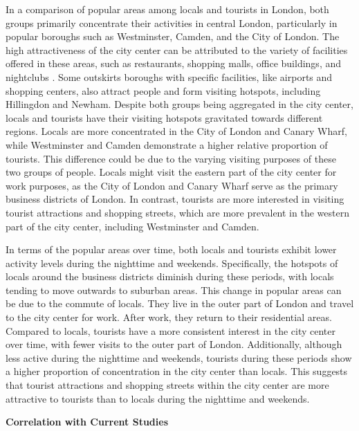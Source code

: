 \documentclass{article}
\theoremstyle{remark}
\begin{document}
In a comparison of popular areas among locals and tourists in London, both groups primarily concentrate their activities in central London, particularly in popular boroughs such as Westminster, Camden, and the City of London. The high attractiveness of the city center can be attributed to the variety of facilities offered in these areas, such as restaurants, shopping malls, office buildings, and nightclubs \citep{lau_understanding_2006}. Some outskirts boroughs with specific facilities, like airports and shopping centers, also attract people and form visiting hotspots, including Hillingdon and Newham. Despite both groups being aggregated in the city center, locals and tourists have their visiting hotspots gravitated towards different regions. Locals are more concentrated in the City of London and Canary Wharf, while Westminster and Camden demonstrate a higher relative proportion of tourists. This difference could be due to the varying visiting purposes of these two groups of people. Locals might visit the eastern part of the city center for work purposes, as the City of London and Canary Wharf serve as the primary business districts of London. In contrast, tourists are more interested in visiting tourist attractions and shopping streets, which are more prevalent in the western part of the city center, including Westminster and Camden.

In terms of the popular areas over time, both locals and tourists exhibit lower activity levels during the nighttime and weekends. Specifically, the hotspots of locals around the business districts diminish during these periods, with locals tending to move outwards to suburban areas. This change in popular areas can be due to the commute of locals. They live in the outer part of London and travel to the city center for work. After work, they return to their residential areas. Compared to locals, tourists have a more consistent interest in the city center over time, with fewer visits to the outer part of London. Additionally, although less active during the nighttime and weekends, tourists during these periods show a higher proportion of concentration in the city center than locals. This suggests that tourist attractions and shopping streets within the city center are more attractive to tourists than to locals during the nighttime and weekends.

\textbf{Correlation with Current Studies}
\end{document}
